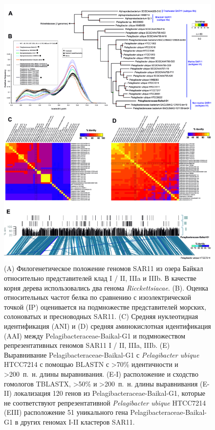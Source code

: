 \documentclass[a4paper,12pt,openany,final]{extreport}
\def\oldcaption{} \let\oldcaption=\caption
\def\caption{\stepcounter{captionsnum}\oldcaption}
\begin{document}
\begin{figure}\centering
  \includegraphics[width=0.8\linewidth]{media/image9.png}
  \caption{(A) Филогенетическое положение геномов SAR11 из озера Байкал относительно представителей клад I / II, IIIa и IIIb. В качестве корня дерева использовались два генома \emph{Ricckettsiacae}. (B). Оценка относительных частот белка по сравнению с изоэлектрической точкой (IP) оценивается на подмножестве представителей морских, солоноватых и пресноводных SAR11. (C) Средняя нуклеотидная идентификация (ANI) и (D) средняя аминокислотная идентификация (AAI) между Pelagibacteraceae-Baikal-G1 и подмножеством репрезентативных геномов SAR11 I / II, IIIa, IIIb. (E) Выравнивание Pelagibacteraceae-Baikal-G1 с \emph{Pelagibacter ubique} HTCC7214 с помощью BLASTN с \textgreater{}70\% идентичности и \textgreater{}200~п.~н. длины выравнивания. (E-I) расположение и сходство гомологов TBLASTX, \textgreater{}50\% и \textgreater{}200~п.~н. длины выравнивания (E-II) локализация 120 генов из Pelagibacteraceae-Baikal-G1, которые не соответствуют репрезентативной \emph{Pelagibacter ubique} HTCC7214 (EIII) расположение 51 уникального гена Pelagibacteraceae-Baikal-G1 в других геномах I-II кластеров SAR11.}\label{fig:4-4}
\end{figure}
\end{document}
